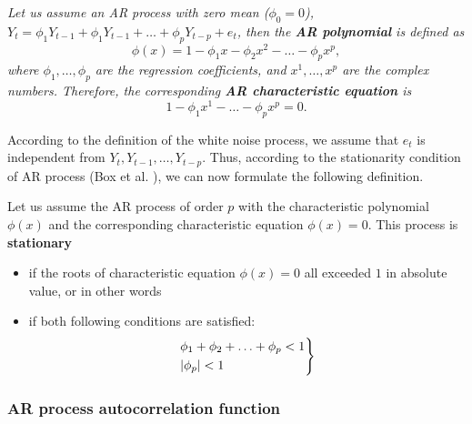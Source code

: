 \begin{definition}
\textit{Let us assume an AR process with zero mean ($\phi_{0} = 0$), $Y_t = \phi_{1}Y_{t-1} + \phi_{1}Y_{t-1} + \ldots + \phi_{p}Y_{t-p} + e_t$, then the \textbf{AR polynomial} is defined as \begin{equation}
    \phi(x) = 1 - \phi_{1}x - \phi_{2}x^2 - \ldots - \phi_{p}x^{p},
    \label{eq_ar_polynomial}
\end{equation} where $\phi_1, \ldots, \phi_p$ are the regression coefficients, and $x^1, \ldots, x^p$ are the complex numbers.
Therefore, the corresponding \textbf{AR characteristic equation} is \begin{equation}
    1 - \phi_{1}x^{1} - \ldots - \phi_{p}x^{p} = 0.
    \label{eq_ar_pol_eq}
\end{equation}}
\label{def_ar_char_polynomial}
\end{definition}
According to the definition of the white noise process, we assume that $e_t$ is independent from $Y_t, Y_{t-1}, \ldots, Y_{t-p}$. Thus, according to the stationarity condition of AR process (Box et al. \cite{box1976time}), we can now formulate the following definition.

\begin{definition}
Let us assume the AR process of order $p$ with the characteristic polynomial $\phi(x)$ and the corresponding characteristic equation $\phi(x) = 0$. This process is \textbf{stationary}
\begin{itemize}
    \item{if the roots of characteristic equation $\phi(x) = 0$ all exceeded $1$ in absolute value, or in other words}
    \item{if both following conditions are satisfied:
        \begin{equation}
            \begin{rcases*}
            \phi_1 + \phi_2 + \ldots + \phi_p < 1 \\
            |\phi_p| < 1 \\
            \end{rcases*}
        \label{eq_stationarity_cond}
        \end{equation}}
\end{itemize}
\label{def_ar_stationarity}
\end{definition} 
\subsubsection{AR process autocorrelation function}

